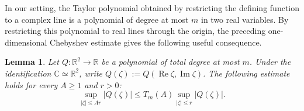 \documentclass[11pt]{article}
\newtheorem{lemma}[theorem]{Lemma}
\theoremstyle{definition}
\newcommand{\C}{\mathbb{C}}
\newcommand{\R}{\mathbb{R}}
\begin{document}
In our setting, the Taylor polynomial obtained by restricting the defining
function to a complex line is a polynomial of degree at most \(m\) in two
real variables.  By restricting this polynomial to real lines through the
origin, the preceding one-dimensional Chebyshev estimate gives the following
useful consequence.

\begin{lemma}
	\label{lem:radial-chebyshev}
    Let \(Q:\R^2\to\R\) be a polynomial of total degree at most \(m\).
    Under the identification \(\C\simeq\R^2\), write
	\(Q(\zeta):=Q(\operatorname{Re}\zeta,\operatorname{Im}\zeta)\).
	The following estimate holds for every \(A\ge1\) and \(r>0\):
	\begin{equation*}
		\sup_{|\zeta|\le Ar}|Q(\zeta)|
		\le
		T_m(A)\sup_{|\zeta|\le r}|Q(\zeta)|.
	\end{equation*}
\end{lemma}
\end{document}
